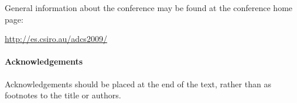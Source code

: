 \documentclass[twocolumn]{article}
\begin{document}
General information about the conference may be found at the
conference home page: 

\begin{center}
\url{http://es.csiro.au/adcs2009/}
\end{center}

\paragraph*{Acknowledgements}

Acknowledgements should be placed at the end of the text, rather than
as footnotes to the title or authors.

\begin{small}

\end{small}
\end{document}
